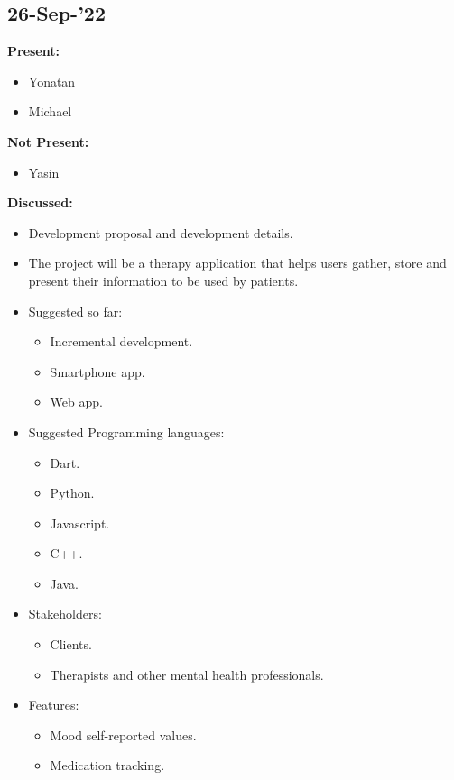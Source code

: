 \documentclass[11pt]{article}
\begin{document}

    \subsection{26-Sep-’22}\label{subsec:26-sep-22}

    \textbf{Present:}
    \begin{itemize}
        \item Yonatan
        \item Michael
    \end{itemize}

    \textbf{Not Present:}

    \begin{itemize}
        \item Yasin
    \end{itemize}

    \textbf{Discussed:}

    \begin{itemize}
        \item  Development proposal and development details.
        \item  The project will be a therapy application that helps users gather, store and present their information to be used by patients.
        \item Suggested so far:
        \begin{itemize}
            \item Incremental development.
            \item Smartphone app.
            \item Web app.
        \end{itemize}
        \item  Suggested Programming languages:
        \begin{itemize}
            \item Dart.
            \item Python.
            \item Javascript.
            \item C++.
            \item Java.
        \end{itemize}
        \item Stakeholders:
        \begin{itemize}
            \item Clients.
            \item Therapists and other mental health professionals.
        \end{itemize}
        \item Features:
        \begin{itemize}
            \item Mood self-reported values.
            \item Medication tracking.
        \end{itemize}

    \end{itemize}
\end{document}
